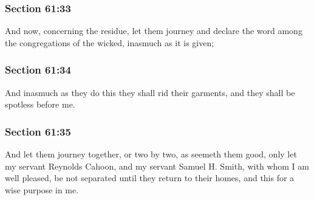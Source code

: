 	\subsubsection{Section 61:33} %
		\label{DC61-33}

		And now, concerning the residue, let them journey and declare the word among the congregations of the wicked, inasmuch as it is given;


	\subsubsection{Section 61:34} %
		\label{DC61-34}

		And inasmuch as they do this they shall rid their garments, and they shall be spotless before me.


	\subsubsection{Section 61:35} %
		\label{DC61-35}

		And let them journey together, or two by two, as seemeth them good, only let my servant Reynolds Cahoon, and my servant Samuel H. Smith, with whom I am well pleased, be not separated until they return to their homes, and this for a wise purpose in me.


